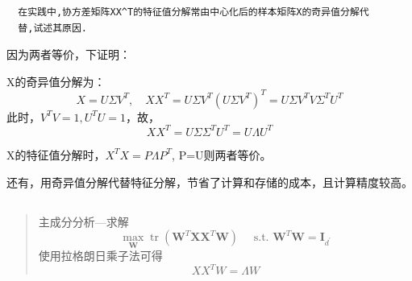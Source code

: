 \documentclass[UTF8,a4paper,AutoFakeBold,AutoFakeSlant]{article}
\begin{document}
\begin{mdframed}[hidealllines=true,backgroundcolor=shadecolor]
  \begin{verbatim}
  在实践中,协方差矩阵XX^T的特征值分解常由中心化后的样本矩阵X的奇异值分解代
  替,试述其原因.
\end{verbatim}
\end{mdframed}

因为两者等价，下证明：

X的奇异值分解为：
$$ X=U \Sigma V^{T}, \quad X X^{T}=U \Sigma V^{T}\left(U \Sigma V^{T}\right)^{T}=U \Sigma V^{T} V \Sigma^{T} U^{T} $$
此时，$ V^TV=1, U^TU=1 $，故，
$$ X X^{T}=U \Sigma \Sigma^{T} U^{T}=U \Lambda U^{T} $$

X的特征值分解时，$ X^TX = P\Lambda P^T $, P=U则两者等价。

还有，用奇异值分解代替特征分解，节省了计算和存储的成本，且计算精度较高。



\subsection{}

\begin{framed}
  \begin{quotation}
    主成分分析—求解
    $$\max _{\boldsymbol{W}} \operatorname{tr}\left(\boldsymbol{W}^{T} \boldsymbol{X} \boldsymbol{X}^{T} \boldsymbol{W}\right) \quad \text { s.t. } \boldsymbol{W}^{T} \boldsymbol{W}=\boldsymbol{I}_{d^{\prime}}$$
    使用拉格朗日乘子法可得
    $$ X X^{T} W=\Lambda W $$
  \end{quotation}
\end{framed}
\end{document}
